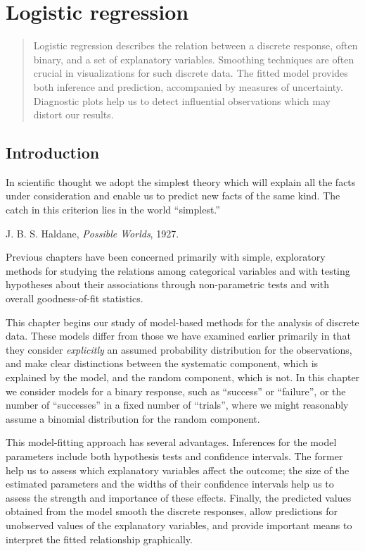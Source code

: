 \chapter{Logistic regression} \label{ch:logistic}

\begin{quote}
{\Large
Logistic regression describes the relation between 
a discrete response, often binary, and a set of explanatory variables.
Smoothing techniques are often crucial in visualizations for such
discrete data.  The fitted model provides both inference and
prediction, accompanied by measures of uncertainty.  Diagnostic
plots help us to detect influential observations which may distort
our results.
}
\end{quote}
\minitoc
\clearpage

\section{Introduction}
\epigraph{In scientific thought we adopt the simplest theory which will explain
all the facts under consideration and enable us to predict new facts of
the same kind. The catch in
this criterion lies in the world ``simplest.''}
{J. B. S. Haldane, \emph{Possible Worlds}, 1927.}
Previous chapters have been concerned primarily with simple,
exploratory methods for studying the relations among categorical
variables and with testing hypotheses about their associations
through non-parametric tests and with overall goodness-of-fit
statistics.

This chapter begins our study of model-based methods for the analysis
of discrete data.  These models differ from those we have examined
earlier primarily in that they consider \emph{explicitly} an
assumed probability distribution for the observations, and make
clear distinctions between the systematic component, which is
explained by the model, and the random component, which is not.
In this chapter we consider models for a binary response,
such as ``success'' or ``failure'',
or the number of ``successes'' in a fixed number of ``trials'',
where we might reasonably assume a binomial distribution for the
random component.

This model-fitting approach has several advantages.
Inferences for the model parameters include both hypothesis tests
and confidence intervals.  The former help us to assess which
explanatory variables affect the outcome;  the size of the estimated
parameters and the widths of their confidence intervals help us to
assess the strength and importance of these effects.
Finally, the predicted values obtained from the model
smooth the discrete responses, allow predictions for unobserved
values of the explanatory variables, and
provide important means to interpret the fitted relationship graphically.

